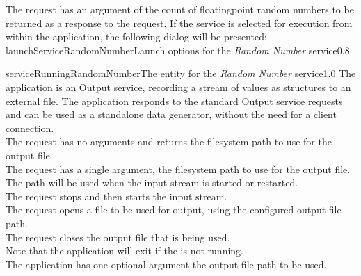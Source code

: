The  request has an argument of the
count of floating\longDash{}point random numbers to be returned as a response to the
request.
%
\condPage
If the service is selected for execution from within the \emph{\MMMU} application, the
following dialog will be presented:
%
{launchServiceRandomNumber}{Launch options for the \emph{Random Number} service}{0.8}

%
{serviceRunningRandomNumber}{The \emph{\MMMU} entity for the \emph{Random Number}
service}{1.0}
\condPage
{}
The  application is an Output
service, recording a stream of \yarp{} values as \json{} structures to an external file.
The application responds to the standard Output service requests and can be used as a
standalone data generator, without the need for a client connection.\\

The  request has no arguments and
returns the file\longDash{}system path to use for the output file.\\

The  request has a single argument,
the file\longDash{}system path to use for the output file.
The path will be used when the input stream is started or restarted.\\

The  request stops and then
starts the input stream.\\

The  request opens a file to be
used for output, using the configured output file path.\\

The  request closes the output
file that is being used.\\

Note that the application will exit if the  is not
running.\\

The application has one optional argument \longDash{} the output file path to be used.
\insertAppParameters
{}
\insertOutputServiceComment\\

